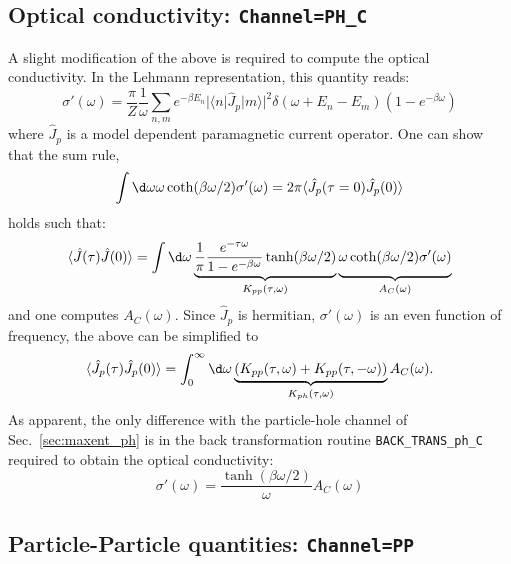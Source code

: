 \subsection{Optical conductivity: \texttt{Channel=PH\_C}}

A  slight modification of the above is required to compute  the optical conductivity. In the Lehmann representation, this quantity reads:
\begin{equation}
  \sigma'(\omega) =  \frac{\pi}{Z} \frac{1}{\omega} \sum_{n,m} e^{-\beta E_n} |\langle n | \hat{J}_p | m \rangle |^2 
  \delta ( \omega + E_n - E_m) \left( 1 - e^{-\beta  \omega} \right) 
\end{equation}
where  $\hat{J}_p$ is a model dependent paramagnetic current operator.  One can show that the sum rule, 
\begin{equation}
	\int \d \omega 	 \omega \coth(\beta \omega/2) \sigma'(\omega) = 
  2 \pi \langle \hat{J}_p(\tau=0) \hat{J}_p(0) \rangle
\end{equation}
holds  such  that: 
\begin{equation}
  \label{eqn:A_ph_C_def}
	\langle \hat{J}(\tau) \hat{J}(0) \rangle  =  
       \int \d \omega  \underbrace{ \frac{1}{\pi} \frac{e^{- \tau \omega} }
            { 1 - e^{-\beta  \omega} } \tanh(\beta \omega/2)  }_{K_{pp}(\tau,\omega)} 
       \underbrace{ \omega \coth(\beta \omega/2) \sigma'(\omega) \vphantom{\frac{1}{2-1}} }_{A_C(\omega)} 
\end{equation}
and one computes $A_C(\omega)$. Since  $\hat{J}_p $  is hermitian, $\sigma'(\omega)$ is an even function of frequency, the above can be simplified to 
\begin{equation} 
    \langle \hat{J}_p(\tau) \hat{J}_p(0) \rangle  =  
         \int_{0}^{\infty}  \d \omega \underbrace{\left( K_{pp}(\tau,\omega)  + K_{pp}(\tau,-\omega) \right)}_{K_{ph}(\tau,\omega)}  A_C(\omega).
\end{equation}
As apparent,  the only difference with the particle-hole channel of Sec.~\ref{sec:maxent_ph} is in the 
back transformation routine \texttt{BACK\_TRANS\_ph\_C}  required to obtain the optical conductivity: 
\begin{equation}
	\sigma'(\omega) =  \frac{\tanh\left( \beta \omega/2\right)}{\omega}A_C(\omega)
\end{equation} 

\subsection{Particle-Particle quantities: \texttt{Channel=PP}}

